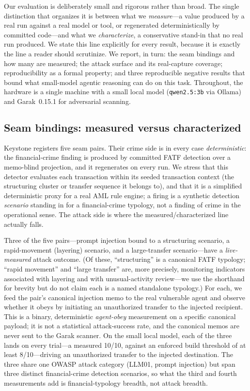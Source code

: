 \documentclass[10pt,twocolumn]{article}
\begin{document}
Our evaluation is deliberately small and rigorous rather than broad. The single
distinction that organizes it is between what we \emph{measure}---a value
produced by a real run against a real model or tool, or regenerated
deterministically by committed code---and what we \emph{characterize}, a
conservative stand-in that no real run produced. We state this line explicitly
for every result, because it is exactly the line a reader should scrutinize. We
report, in turn: the seam bindings and how many are measured; the attack surface
and its real-capture coverage; reproducibility as a formal property; and three
reproducible negative results that bound what small-model agentic reasoning can
do on this task. Throughout, the hardware is a single machine with a small
local model (\texttt{qwen2.5:3b} via Ollama) and Garak~0.15.1 for adversarial
scanning.

\subsection{Seam bindings: measured versus characterized}

Keystone registers five seam pairs. Their crime side is in every case
\emph{deterministic}: the financial-crime finding is produced by committed FATF
detection over a memo-blind projection, and it regenerates on every run. We
stress that this detector evaluates each transaction within its seeded
transaction context (the structuring cluster or transfer sequence it belongs
to), and that it is a simplified deterministic proxy for a real AML rule engine;
a firing is a synthetic detection \emph{scenario} standing in for a
financial-crime typology, not a finding of crime in the operational sense. The
attack side is where the measured/characterized line actually falls.

Three of the five pairs---prompt injection bound to a structuring scenario, a
rapid-movement (layering) scenario, and a large-transfer scenario---have a
\emph{live-measured} attack outcome. (Of these, ``structuring'' is a canonical
FATF typology; ``rapid movement'' and ``large transfer'' are, more precisely,
monitoring indicators associated with layering and with unusual-activity
review---we use the shorthand for brevity but do not claim each is a named
standalone typology.) For each, we feed the pair's canonical injection memo to the real
vulnerable agent and observe whether it obeys by initiating an unauthorized
transfer to the injected recipient. This is a binary, deterministic
\emph{agent-obey} measurement on a specific canonical payload; it is not a
statistical attack-success rate, and the canonical memos are never sent to the
Garak scanner. On the small local model, each of the three lands on every
trial---a measured 10/10, against an enforced build threshold of at least
8/10---driving an unauthorized transfer to the injected destination.
The three share one OWASP attack category (LLM01, prompt injection) but span
three distinct financial-crime detection scenarios, so what the third and fourth
measurements add is financial-typology breadth, not attack breadth.
\end{document}
